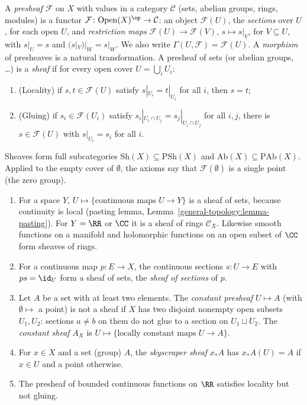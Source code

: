 \begin{definition}\label{sheaves:definition-presheaf}
A \emph{presheaf} $\mathcal{F}$ on $X$ with values in a category $\mathcal{C}$ (sets, abelian groups, rings, modules) is a functor
$\mathcal{F} \colon \mathrm{Open}(X)^{\op} \to \mathcal{C}$: an object $\mathcal{F}(U)$, the \emph{sections} over $U$, for each open $U$, and \emph{restriction maps}
$\mathcal{F}(U) \to \mathcal{F}(V)$, $s \mapsto s|_V$, for $V \subseteq U$, with $s|_U = s$ and $(s|_V)|_W = s|_W$. We also write $\Gamma(U, \mathcal{F}) = \mathcal{F}(U)$. A
\emph{morphism} of presheaves is a natural transformation. A presheaf of sets (or abelian groups, \ldots) is a \emph{sheaf} if for every open cover
$U = \bigcup_i U_i$:
\begin{enumerate}
\item (Locality) if $s, t \in \mathcal{F}(U)$ satisfy $s|_{U_i} = t|_{U_i}$ for all $i$, then $s = t$;
\item (Gluing) if $s_i \in \mathcal{F}(U_i)$ satisfy $s_i|_{U_i \cap U_j} = s_j|_{U_i \cap U_j}$ for all $i, j$, there is $s \in \mathcal{F}(U)$ with $s|_{U_i} = s_i$ for all $i$.
\end{enumerate}
Sheaves form full subcategories $\mathrm{Sh}(X) \subseteq \mathrm{PSh}(X)$ and $\mathrm{Ab}(X) \subseteq \mathrm{PAb}(X)$. Applied to the empty cover of $\emptyset$, the axioms say that
$\mathcal{F}(\emptyset)$ is a single point (the zero group).
\end{definition}

\begin{example}\label{sheaves:example-sheaves}
\begin{enumerate}
\item For a space $Y$, $U \mapsto \{\text{continuous maps } U \to Y\}$ is a sheaf of sets, because continuity is local (pasting lemma,
Lemma~\ref{general-topology:lemma-pasting}). For $Y = \RR$ or $\CC$ it is a sheaf of rings $\mathcal{C}_X$. Likewise smooth functions on a manifold and holomorphic
functions on an open subset of $\CC$ form sheaves of rings.
\item For a continuous map $p \colon E \to X$, the continuous sections $s \colon U \to E$ with $ps = \id_U$ form a sheaf of sets, the \emph{sheaf of sections} of $p$.
\item Let $A$ be a set with at least two elements. The \emph{constant presheaf} $U \mapsto A$ (with $\emptyset \mapsto$ a point) is not a sheaf if $X$ has two disjoint nonempty open
subsets $U_1, U_2$: sections $a \neq b$ on them do not glue to a section on $U_1 \sqcup U_2$. The \emph{constant sheaf} $A_X$ is $U \mapsto \{\text{locally constant maps } U \to A\}$.
\item For $x \in X$ and a set (group) $A$, the \emph{skyscraper sheaf} $x_*A$ has $x_*A(U) = A$ if $x \in U$ and a point otherwise.
\item The presheaf of bounded continuous functions on $\RR$ satisfies locality but not gluing.
\end{enumerate}
\end{example}

